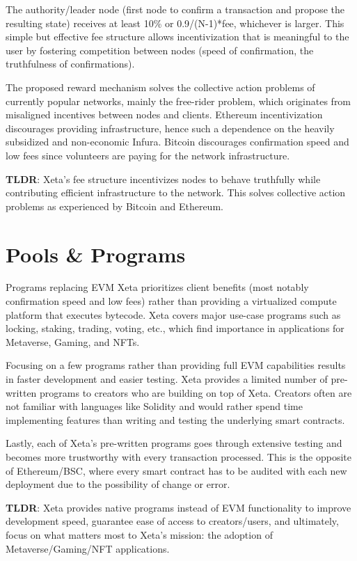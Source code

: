 \documentclass{article}
\begin{document}
The authority/leader node (first node to confirm a transaction and propose the resulting state) receives at least 10\% or 0.9/(N-1)*fee, whichever is larger. This simple but effective fee structure allows incentivization that is meaningful to the user by fostering competition between nodes (speed of confirmation, the truthfulness of confirmations).
\bigskip

The proposed reward mechanism solves the collective action problems of currently popular networks, mainly the free-rider problem, which originates from misaligned incentives between nodes and clients. Ethereum incentivization discourages providing infrastructure, hence such a dependence on the heavily subsidized and non-economic Infura. Bitcoin discourages confirmation speed and low fees since volunteers are paying for the network infrastructure.
\bigskip

\textbf{TLDR}: Xeta's fee structure incentivizes nodes to behave truthfully while contributing efficient infrastructure to the network. This solves collective action problems as experienced by Bitcoin and Ethereum.

\section{Pools \& Programs}
Programs replacing EVM
Xeta prioritizes client benefits (most notably confirmation speed and low fees) rather than providing a virtualized compute platform that executes bytecode. Xeta covers major use-case programs such as locking, staking, trading, voting, etc., which find importance in applications for Metaverse, Gaming, and NFTs.
\bigskip

Focusing on a few programs rather than providing full EVM capabilities results in faster development and easier testing. Xeta provides a limited number of pre-written programs to creators who are building on top of Xeta. Creators often are not familiar with languages like Solidity and would rather spend time implementing features than writing and testing the underlying smart contracts.
\bigskip

Lastly, each of Xeta's pre-written programs goes through extensive testing and becomes more trustworthy with every transaction processed. This is the opposite of Ethereum/BSC, where every smart contract has to be audited with each new deployment due to the possibility of change or error.
\bigskip

\textbf{TLDR}: Xeta provides native programs instead of EVM functionality to improve development speed, guarantee ease of access to creators/users, and ultimately, focus on what matters most to Xeta's mission: the adoption of Metaverse/Gaming/NFT applications.
\end{document}
